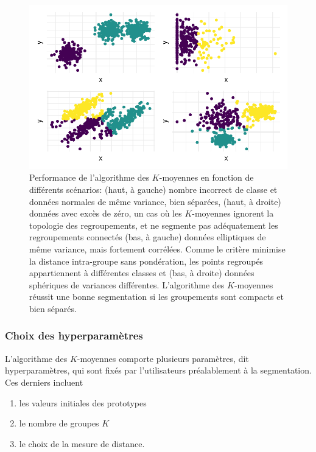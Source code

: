 \documentclass[
  11pt,
  letterpaper,
]{scrbook}
\providecommand{\tightlist}{%
  \setlength{\itemsep}{0pt}\setlength{\parskip}{0pt}}\usepackage{longtable,booktabs,array}
\theoremstyle{definition}
\theoremstyle{remark}
\begin{document}
\begin{figure}[ht!]

{\centering \includegraphics{./03-regroupements_files/figure-pdf/kmoyperfo-1.pdf}

}

\caption{Performance de l'algorithme des \(K\)-moyennes en fonction de
différents scénarios: (haut, à gauche) nombre incorrect de classe et
données normales de même variance, bien séparées, (haut, à droite)
données avec excès de zéro, un cas où les \(K\)-moyennes ignorent la
topologie des regroupements, et ne segmente pas adéquatement les
regroupements connectés (bas, à gauche) données elliptiques de même
variance, mais fortement corrélées. Comme le critère minimise la
distance intra-groupe sans pondération, les points regroupés
appartiennent à différentes classes et (bas, à droite) données
sphériques de variances différentes. L'algorithme des \(K\)-moyennes
réussit une bonne segmentation si les groupements sont compacts et bien
séparés.}

\end{figure}

\hypertarget{choix-des-hyperparamuxe8tres}{%
\subsubsection*{Choix des
hyperparamètres}\label{choix-des-hyperparamuxe8tres}}

L'algorithme des \(K\)-moyennes comporte plusieurs paramètres, dit
hyperparamètres, qui sont fixés par l'utilisateurs préalablement à la
segmentation. Ces derniers incluent

\begin{enumerate}
\def\labelenumi{\arabic{enumi}.}
\tightlist
\item
  les valeurs initiales des prototypes
\item
  le nombre de groupes \(K\)
\item
  le choix de la mesure de distance.
\end{enumerate}
\end{document}
